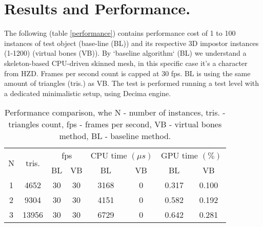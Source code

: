 \documentclass{acmsiggraph}
\begin{document}
\section{Results and Performance.}

The following (table \ref{performance}) contains performance cost of 1 to 100 instances of test object (base-line (BL)) and its respective 3D impostor instances (1-1200) (virtual bones (VB)). By `baseline algorithm` (BL) we understand a skeleton-based CPU-driven skinned mesh, in this specific case it's a character from HZD. Frames per second count is capped at 30 fps. BL is using the same amount of triangles (tris.) as VB.  The test is performed running a test level with a dedicated minimalistic setup, using Decima engine.

\begin{table}[h]
  \centering
  \caption{Performance comparison, whe N - number of instances, tris. - triangles count, fps - frames per second, VB - virtual bones method, BL - baseline method.}
  \begin{tabular}{|c|c|c|c|c|c|c|c|}
    \hline
    \multirow{2}{*}{N} & \multirow{2}{*}{tris.} & \multicolumn{2}{|c|}{fps}& \multicolumn{2}{|c|}{CPU time \( (\mu s) \)} & \multicolumn{2}{|c|}{GPU time \( (\%) \) }  \\ \cline{3-8}
                       &                        & BL & VB                  & BL    & VB                                    & BL    & VB                                 \\       
    \hline                                                                                                                                                   
                    1  & 4652                   & 30 & 30                  & 3168  & 0                                     & 0.317 & 0.100                              \\   
    \hline                                                                                                                                                      
                    2  & 9304                   & 30 & 30                  & 4151  & 0                                     & 0.582 & 0.192                              \\   
    \hline                                                                             
                    3  & 13956                  & 30 & 30                  & 6729  & 0                                     & 0.642 & 0.281                              \\   

\end{tabular}
\end{table}
\end{document}
